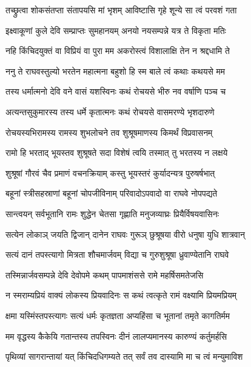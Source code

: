 \twolineshloka
{तच्छ्रुत्वा शोकसंतप्ता संतापयसि मां भृशम्}
{आविष्टासि गृहे शून्ये सा त्वं परवशं गता} %

\twolineshloka
{इक्ष्वाकूणां कुले देवि सम्प्राप्तः सुमहानयम्}
{अनयो नयसम्पन्ने यत्र ते विकृता मतिः} %

\twolineshloka
{नहि किंचिदयुक्तं वा विप्रियं वा पुरा मम}
{अकरोस्त्वं विशालाक्षि तेन न श्रद्दधामि ते} %

\twolineshloka
{ननु ते राघवस्तुल्यो भरतेन महात्मना}
{बहुशो हि स्म बाले त्वं कथाः कथयसे मम} %

\twolineshloka
{तस्य धर्मात्मनो देवि वने वासं यशस्विनः}
{कथं रोचयसे भीरु नव वर्षाणि पञ्च च} %

\twolineshloka
{अत्यन्तसुकुमारस्य तस्य धर्मे कृतात्मनः}
{कथं रोचयसे वासमरण्ये भृशदारुणे} %

\twolineshloka
{रोचयस्यभिरामस्य रामस्य शुभलोचने}
{तव शुश्रूषमाणस्य किमर्थं विप्रवासनम्} %

\twolineshloka
{रामो हि भरताद् भूयस्तव शुश्रूषते सदा}
{विशेषं त्वयि तस्मात् तु भरतस्य न लक्षये} %

\twolineshloka
{शुश्रूषां गौरवं चैव प्रमाणं वचनक्रियाम्}
{कस्तु भूयस्तरं कुर्यादन्यत्र पुरुषर्षभात्} %

\twolineshloka
{बहूनां स्त्रीसहस्राणां बहूनां चोपजीविनाम्}
{परिवादोऽपवादो वा राघवे नोपपद्यते} %

\twolineshloka
{सान्त्वयन् सर्वभूतानि रामः शुद्धेन चेतसा}
{गृह्णाति मनुजव्याघ्रः प्रियैर्विषयवासिनः} %

\twolineshloka
{सत्येन लोकाञ् जयति द्विजान् दानेन राघवः}
{गुरूञ् छुश्रूषया वीरो धनुषा युधि शात्रवान्} %

\twolineshloka
{सत्यं दानं तपस्त्यागो मित्रता शौचमार्जवम्}
{विद्या च गुरुशुश्रूषा ध्रुवाण्येतानि राघवे} %

\twolineshloka
{तस्मिन्नार्जवसम्पन्ने देवि देवोपमे कथम्}
{पापमाशंससे रामे महर्षिसमतेजसि} %

\twolineshloka
{न स्मराम्यप्रियं वाक्यं लोकस्य प्रियवादिनः}
{स कथं त्वत्कृते रामं वक्ष्यामि प्रियमप्रियम्} %

\twolineshloka
{क्षमा यस्मिंस्तपस्त्यागः सत्यं धर्मः कृतज्ञता}
{अप्यहिंसा च भूतानां तमृते कागतिर्मम} %

\twolineshloka
{मम वृद्धस्य कैकेयि गतान्तस्य तपस्विनः}
{दीनं लालप्यमानस्य कारुण्यं कर्तुमर्हसि} %

\twolineshloka
{पृथिव्यां सागरान्तायां यत् किंचिदधिगम्यते}
{तत् सर्वं तव दास्यामि मा च त्वं मन्युमाविश} %

